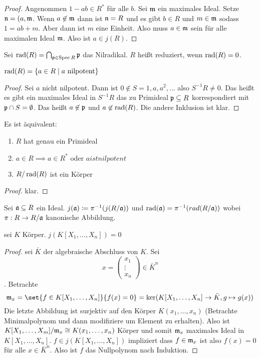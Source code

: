 \begin{proof}
    Angenommen \(1-ab\in R^{*}\) für alle \(b\). Sei \(\mathfrak{m}\) ein maximales Ideal. Setze \(\mathfrak{n}=(a,\mathfrak{m}\). Wenn \(a\not\in\mathfrak{m}\) dann ist \(\mathfrak{n}=R\) und es gibt \(b\in R\) und \(m\in\mathfrak{m}\) sodass \(1=ab+m\). Aber dann ist \(m\) eine Einheit. Also muss \(a\in\mathfrak{m}\) sein für alle maximalen Ideal \(\mathfrak{m}\). Also ist \(a\in j(R)\).
\end{proof}
\begin{Def}
    Sei \(\operatorname{rad}(R)=\bigcap_{\mathfrak{p}\in \operatorname{Spec} R}\mathfrak{p}\) das Nilradikal. \(R\) heißt reduziert, wenn \(\operatorname{rad}(R)=0\).
\end{Def}
\begin{Satz}
    \(\operatorname{rad}(R)=\{a\in R\mid a \text{ nilpotent}\}\)
\end{Satz}
\begin{proof}
    Sei \(a\) nicht nilpotent. Dann ist \(0\not\in S={1,a,a^2,\dots}\) also \(S^{-1}R\neq 0\).
    Das heißt es gibt ein maximales Ideal in \(S^{-1}R\) das zu Primideal \(\mathfrak{p}\subseteq R\) korrespondiert mit \(\mathfrak{p}\cap S=\emptyset\).
    Das heißt \(a\not\in\mathfrak{p}\) und \(a\not\in \operatorname{rad}(R)\). Die andere Inklusion ist klar.
\end{proof}
\begin{Lemma}
    Es ist äquivalent:
    \begin{enumerate}
        \item \(R\) hat genau ein Primideal
        \item \(a\in R\implies a\in R^* \text{ oder } a ist nilpotent\)
        \item \(R/\operatorname{rad}(R)\) ist ein Körper
    \end{enumerate}
\end{Lemma}
\begin{proof}
    klar.
\end{proof}
\begin{Def}
    Sei \(\mathfrak{a}\subseteq R\) ein Ideal. \(j(\mathfrak{a})\coloneq \pi^{-1}(j(R/\mathfrak{a}))\) und \(\operatorname{rad}(\mathfrak{a})=\pi^{-1}(rad(R/\mathfrak{a}))\) wobei \(\pi:R\to R/\mathfrak{a}\) kanonische Abbildung.
\end{Def}
\begin{Satz}
    sei \(K\) Körper. \(j(K[X_1,\dots,X_n])=0\)
\end{Satz}
\begin{proof}
    sei \(\bar K\) der algebraische Abschluss von \(K\).
    Sei  \[x=\begin{pmatrix}
        x_1\\ \vdots\\ x_n
    \end{pmatrix}\in \bar K^n\] . Betrachte 
    \[\frakm_x=\set{f\in K[X_1,\dots,X_n]}{f(x)=0}=\ker(K[X_1,\dots,X_n]\to\bar K, g\mapsto g(x))\]
    Die letzte Abbildung ist surjektiv auf den Körper \(K(x_1,\dots,x_n)\) (Betrachte Minimalpolynom und dann modifiziere um Element zu erhalten).
    Also ist \(K[X_1,\dots,X_m]/\mathfrak{m}_x\cong K(x_1,\dots,x_n)\) Körper und somit \(\mathfrak{m}_x\) maximales Ideal in \(K[X_1,\dots,X_n]\).
    \(f\in j(K[X_1,\dots,X_n])\) impliziert dass \(f\in\mathfrak{m}_x\) ist also \(f(x)=0\) für alle \(x\in\bar K^{n}\). Also ist \(f\) das Nullpolynom nach Induktion.
\end{proof}
